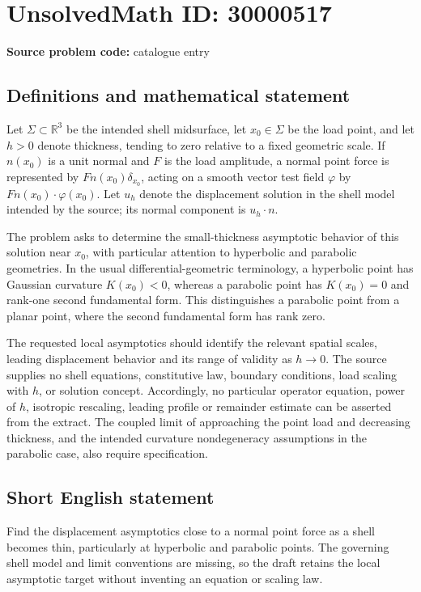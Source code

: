 \documentclass[11pt]{article}
\newcommand{\R}{\mathbb{R}}
\begin{document}
\section*{UnsolvedMath ID: 30000517}
\textbf{Source problem code:} catalogue entry
\subsection{Definitions and mathematical statement}
Let $\Sigma\subset\R^3$ be the intended shell midsurface, let $x_0\in\Sigma$ be the load point, and let $h>0$ denote thickness, tending to zero relative to a fixed geometric scale. If $n(x_0)$ is a unit normal and $F$ is the load amplitude, a normal point force is represented by $F n(x_0)\delta_{x_0}$, acting on a smooth vector test field $\varphi$ by $F n(x_0)\cdot\varphi(x_0)$. Let $u_h$ denote the displacement solution in the shell model intended by the source; its normal component is $u_h\cdot n$.

The problem asks to determine the small-thickness asymptotic behavior of this solution near $x_0$, with particular attention to hyperbolic and parabolic geometries. In the usual differential-geometric terminology, a hyperbolic point has Gaussian curvature $K(x_0)<0$, whereas a parabolic point has $K(x_0)=0$ and rank-one second fundamental form. This distinguishes a parabolic point from a planar point, where the second fundamental form has rank zero.

The requested local asymptotics should identify the relevant spatial scales, leading displacement behavior and its range of validity as $h\to0$. The source supplies no shell equations, constitutive law, boundary conditions, load scaling with $h$, or solution concept. Accordingly, no particular operator equation, power of $h$, isotropic rescaling, leading profile or remainder estimate can be asserted from the extract. The coupled limit of approaching the point load and decreasing thickness, and the intended curvature nondegeneracy assumptions in the parabolic case, also require specification.
\subsection{Short English statement}
Find the displacement asymptotics close to a normal point force as a shell becomes thin, particularly at hyperbolic and parabolic points. The governing shell model and limit conventions are missing, so the draft retains the local asymptotic target without inventing an equation or scaling law.
\end{document}

